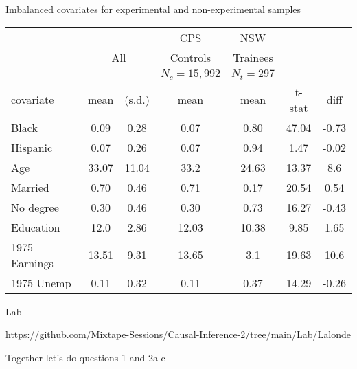 \documentclass{beamer}
\begin{document}
\begin{frame}[plain,shrink=10]{Imbalanced covariates for experimental and non-experimental samples}

    \begin{center}
		\begin{table}
		\begin{tabular}{lcccccc}
		\hline \hline
		\multicolumn{3}{c}{}&
		\multicolumn{1}{c}{CPS}&
		\multicolumn{1}{c}{NSW}\\
		
		\multicolumn{1}{c}{}&
		\multicolumn{2}{c}{All} &
		\multicolumn{1}{c}{Controls} &
		\multicolumn{1}{c}{Trainees} \\

		\multicolumn{3}{c}{}&
		\multicolumn{1}{c}{$N_c=15,992$}&
		\multicolumn{1}{c}{$N_t=297$}&
		\multicolumn{1}{c}{}&
		\multicolumn{1}{c}{}\\

		\multicolumn{1}{l}{covariate}&
		\multicolumn{1}{c}{mean}&
		\multicolumn{1}{c}{(s.d.)}&
		\multicolumn{1}{c}{mean}&
		\multicolumn{1}{c}{mean}&
		\multicolumn{1}{c}{t-stat}&
		\multicolumn{1}{c}{diff}\\
		\hline
Black    & 0.09 & 0.28 & 0.07 & 0.80 & 47.04 & -0.73\\
Hispanic & 0.07 & 0.26 & 0.07 & 0.94 & 1.47 & -0.02\\
Age & 33.07 & 11.04 & 33.2 & 24.63 & 13.37  & 8.6\\
Married & 0.70 & 0.46 & 0.71 & 0.17 & 20.54 & 0.54\\
No degree & 0.30 & 0.46 & 0.30 & 0.73 & 16.27 & -0.43\\
Education & 12.0 & 2.86 & 12.03 & 10.38 & 9.85 & 1.65 \\
1975 Earnings   & 13.51 & 9.31 & 13.65 & 3.1 & 19.63 & 10.6\\
1975 Unemp  & 0.11 & 0.32 & 0.11 & 0.37 & 14.29 & -0.26\\
		\hline 
		\end{tabular}
		\end{table}
    \end{center}

\end{frame}


\begin{frame}{Lab}

\url{https://github.com/Mixtape-Sessions/Causal-Inference-2/tree/main/Lab/Lalonde}

\bigskip

Together let's do questions 1 and 2a-c

\end{frame}
\end{document}
